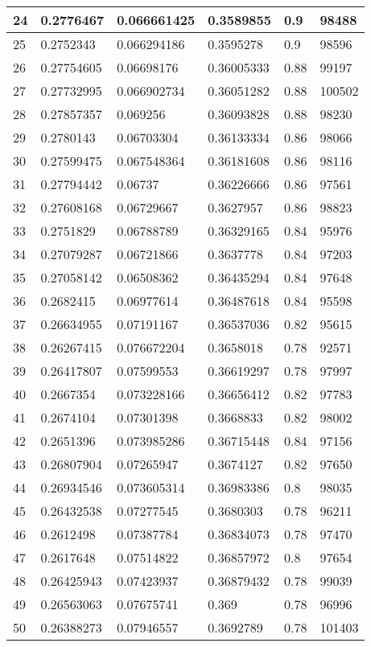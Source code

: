 \begin{longtable}{|l|l|l|l|l|l|}
24 & 0.2776467 & 0.066661425 & 0.3589855 & 0.9 & 98488 \\ \hline 
25 & 0.2752343 & 0.066294186 & 0.3595278 & 0.9 & 98596 \\ \hline 
26 & 0.27754605 & 0.06698176 & 0.36005333 & 0.88 & 99197 \\ \hline 
27 & 0.27732995 & 0.066902734 & 0.36051282 & 0.88 & 100502 \\ \hline 
28 & 0.27857357 & 0.069256 & 0.36093828 & 0.88 & 98230 \\ \hline 
29 & 0.2780143 & 0.06703304 & 0.36133334 & 0.86 & 98066 \\ \hline 
30 & 0.27599475 & 0.067548364 & 0.36181608 & 0.86 & 98116 \\ \hline 
31 & 0.27794442 & 0.06737 & 0.36226666 & 0.86 & 97561 \\ \hline 
32 & 0.27608168 & 0.06729667 & 0.3627957 & 0.86 & 98823 \\ \hline 
33 & 0.2751829 & 0.06788789 & 0.36329165 & 0.84 & 95976 \\ \hline 
34 & 0.27079287 & 0.06721866 & 0.3637778 & 0.84 & 97203 \\ \hline 
35 & 0.27058142 & 0.06508362 & 0.36435294 & 0.84 & 97648 \\ \hline 
36 & 0.2682415 & 0.06977614 & 0.36487618 & 0.84 & 95598 \\ \hline 
37 & 0.26634955 & 0.07191167 & 0.36537036 & 0.82 & 95615 \\ \hline 
38 & 0.26267415 & 0.076672204 & 0.3658018 & 0.78 & 92571 \\ \hline 
39 & 0.26417807 & 0.07599553 & 0.36619297 & 0.78 & 97997 \\ \hline 
40 & 0.2667354 & 0.073228166 & 0.36656412 & 0.82 & 97783 \\ \hline 
41 & 0.2674104 & 0.07301398 & 0.3668833 & 0.82 & 98002 \\ \hline 
42 & 0.2651396 & 0.073985286 & 0.36715448 & 0.84 & 97156 \\ \hline 
43 & 0.26807904 & 0.07265947 & 0.3674127 & 0.82 & 97650 \\ \hline 
44 & 0.26934546 & 0.073605314 & 0.36983386 & 0.8 & 98035 \\ \hline 
45 & 0.26432538 & 0.07277545 & 0.3680303 & 0.78 & 96211 \\ \hline 
46 & 0.2612498 & 0.07387784 & 0.36834073 & 0.78 & 97470 \\ \hline 
47 & 0.2617648 & 0.07514822 & 0.36857972 & 0.8 & 97654 \\ \hline 
48 & 0.26425943 & 0.07423937 & 0.36879432 & 0.78 & 99039 \\ \hline 
49 & 0.26563063 & 0.07675741 & 0.369 & 0.78 & 96996 \\ \hline 
50 & 0.26388273 & 0.07946557 & 0.3692789 & 0.78 & 101403 \\ \hline 
\end{longtable}
